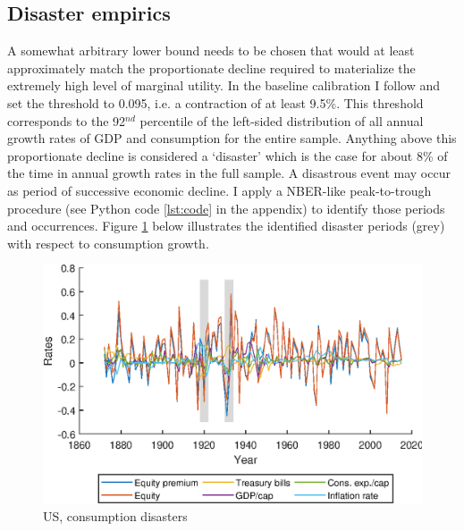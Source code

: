 {{{{\subsection{Disaster empirics}

A somewhat arbitrary lower bound \cite{Barro2006} needs to be chosen that would at least approximately match the proportionate decline required to materialize the extremely high level of marginal utility. In the baseline calibration I follow \citet{Barro2012} and set the threshold to 0.095, i.e. a contraction of at least 9.5\%. This threshold corresponds to the 92$^{nd}$ percentile of the left-sided distribution of all annual growth rates of GDP and consumption for the entire sample. Anything above this proportionate decline is considered a `disaster' which is the case for about 8\% of the time in annual growth rates in the full sample.
A disastrous event may occur as period of successive economic decline. I apply a NBER-like peak-to-trough procedure (see Python code \ref{lst:code} in the appendix) to identify those periods and occurrences. Figure \ref{fig:US_cons_disaster} below illustrates the identified disaster periods (grey) with respect to consumption growth. 

\begin{figure}[H]
	\centering
  \includegraphics[width=\textwidth]{Matlab Graphics/Cons_disaster_US}
	\caption{US, consumption disasters}
	\label{fig:US_cons_disaster}
\end{figure}

}}}}
